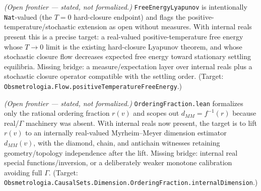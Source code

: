 \begin{theorem}\label{thm:positive-temperature-free-energy-flow}\notready{}
\emph{(Open frontier --- stated, not formalized.)} \texttt{FreeEnergyLyapunov} is intentionally
\texttt{Nat}-valued (the $T=0$ hard-closure endpoint) and flags the positive-temperature/stochastic
extension as open without measures. With internal reals present this is a precise target: a
real-valued positive-temperature free energy whose $T\to 0$ limit is the existing hard-closure
Lyapunov theorem, and whose stochastic closure flow decreases expected free energy toward
stationary settling equilibria. Missing bridge: a measure/expectation layer over internal reals
plus a stochastic closure operator compatible with the settling order. (Target:
\texttt{Obsmetrologia.Flow.positiveTemperatureFreeEnergy}.)
\end{theorem}

\begin{theorem}\label{thm:myrheim-meyer-dimension-internal-reals}\notready{}
\emph{(Open frontier --- stated, not formalized.)} \texttt{OrderingFraction.lean} formalizes only the
rational ordering fraction $r(v)$ and scopes out $d_{MM}=f^{-1}(r)$ because real/$\Gamma$ machinery
was absent. With internal
reals now present, the target is to lift $r(v)$ to an internally real-valued Myrheim--Meyer
dimension estimator $d_{MM}(v)$, with the diamond, chain, and antichain witnesses retaining
geometry/topology independence after the lift. Missing bridge: internal real special
functions/inversion, or a deliberately weaker monotone calibration avoiding full $\Gamma$.
(Target: \texttt{Obsmetrologia.CausalSets.Dimension.OrderingFraction.internalDimension}.)
\end{theorem}
